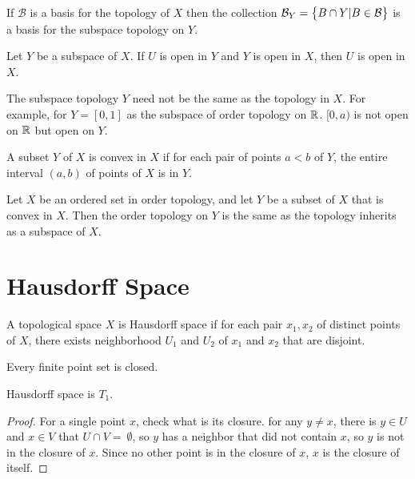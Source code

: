 \begin{theorem}
    If $\mathcal{B}$ is a basis for the topology of $X$ then the collection $\mathcal{B}_Y = \set{B \cap Y | B \in \mathcal{B}}$ is a basis for the subspace topology on $Y$.
\end{theorem}

\begin{theorem}
    Let $Y$ be a subspace of $X$. If $U$ is open in $Y$ and $Y$ is open in $X$, then $U$ is open in $X$.    
\end{theorem}

The subspace topology $Y$ need not be the same as the topology in $X$. For example, for $Y=[0,1]$ as the subspace of order topology on $\mathbb{R}$. $[0,a)$ is not open on $\mathbb{R}$ but open on $Y$.


\begin{theorem}
    A subset $Y$ of $X$ is convex in $X$ if for each pair of points $a < b$ of $Y$, the entire interval $(a,b)$ of points of $X$ is in $Y$.     
\end{theorem}

\begin{theorem}\label{convex_order_topology_are_the_same}
    Let $X$ be an ordered set in order topology, and let $Y$ be a subset of $X$ that is convex in $X$. Then the order topology on $Y$ is the same as the topology inherits as a subspace of $X$.    
\end{theorem}






\section{Hausdorff Space}

\begin{definition}
    A topological space $X$ is Hausdorff space if for each pair $x_1, x_2$ of distinct points of $X$, there exists neighborhood $U_1$ and $U_2$ of $x_1$ and $x_2$ that are disjoint.
\end{definition}

\begin{definition}
Every finite point set is closed.    
\end{definition}

\begin{theorem}
    Hausdorff space is $T_1$.
\end{theorem}
\begin{proof}
    For a single point $x$, check what is its closure. for any $y \neq x$, there is $y \in U$ and $x \in V$ that $U \cap V = \ \emptyset$, so $y$ has a neighbor that did not contain $x$, so $y$ is not in the closure of $x$. Since no other point is in the closure of $x$, $x$ is the closure of itself.
\end{proof}


